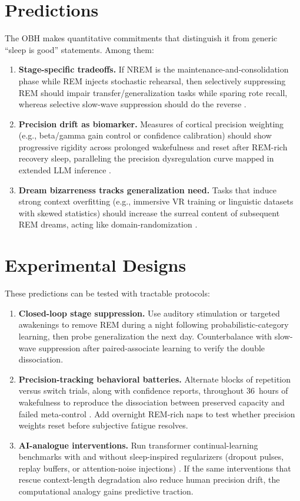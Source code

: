 \section{Predictions}\label{sec:falsifiability_predictions}
The OBH makes quantitative commitments that distinguish it from generic ``sleep is good'' statements. Among them:
\begin{enumerate}
    \item \textbf{Stage-specific tradeoffs.} If NREM is the maintenance-and-consolidation phase while REM injects stochastic
    rehearsal, then selectively suppressing REM should impair transfer/generalization tasks while sparing rote recall, whereas
    selective slow-wave suppression should do the reverse \citep{diekelmann2010}.
    \item \textbf{Precision drift as biomarker.} Measures of cortical precision weighting (e.g., beta/gamma gain control or
    confidence calibration) should show progressive rigidity across prolonged wakefulness and reset after REM-rich recovery sleep,
    paralleling the precision dysregulation curve mapped in extended LLM inference \citep{franklin2023precision}.
    \item \textbf{Dream bizarreness tracks generalization need.} Tasks that induce strong context overfitting (e.g., immersive VR
    training or linguistic datasets with skewed statistics) should increase the surreal content of subsequent REM dreams, acting
    like domain-randomization \citep{hoel2021overfitted}.
\end{enumerate}

\section{Experimental Designs}\label{sec:falsifiability_experiments}
These predictions can be tested with tractable protocols:
\begin{enumerate}
    \item \textbf{Closed-loop stage suppression.} Use auditory stimulation or targeted awakenings to remove REM during a night
    following probabilistic-category learning, then probe generalization the next day. Counterbalance with slow-wave suppression
    after paired-associate learning to verify the double dissociation.
    \item \textbf{Precision-tracking behavioral batteries.} Alternate blocks of repetition versus switch trials, along with
    confidence reports, throughout 36~hours of wakefulness to reproduce the dissociation between preserved capacity and failed
    meta-control \citep{couyoumdjian2010}. Add overnight REM-rich naps to test whether precision weights reset before subjective
    fatigue resolves.
    \item \textbf{AI-analogue interventions.} Run transformer continual-learning benchmarks with and without sleep-inspired
    regularizers (dropout pulses, replay buffers, or attention-noise injections) \citep{chen2023attention_sink, li2024lengthcollapse}. If
the same interventions that rescue context-length degradation also reduce human precision drift, the computational analogy gains
predictive traction.
\end{enumerate}
